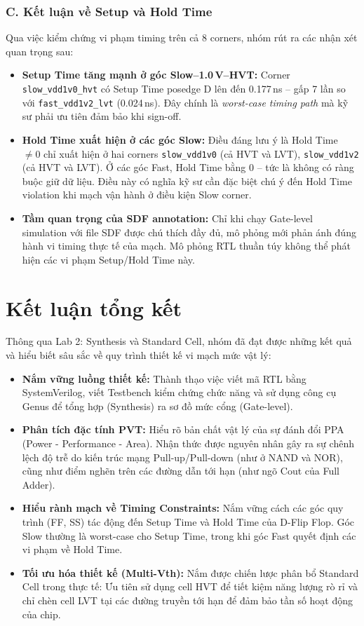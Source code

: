 \documentclass[12pt, a4paper, oneside]{article}
\begin{document}
\subsubsection*{C. Kết luận về Setup và Hold Time}

Qua việc kiểm chứng vi phạm timing trên cả 8 corners, nhóm rút ra các nhận xét quan
trọng sau:

\begin{itemize}
    \item \textbf{Setup Time tăng mạnh ở góc Slow--1.0\,V--HVT:} Corner
    \texttt{slow\_vdd1v0\_hvt} có Setup Time posedge D lên đến 0.177\,ns -- gấp 7 lần so
    với \texttt{fast\_vdd1v2\_lvt} (0.024\,ns). Đây chính là \emph{worst-case timing path}
    mà kỹ sư phải ưu tiên đảm bảo khi sign-off.
    \item \textbf{Hold Time xuất hiện ở các góc Slow:} Điều đáng lưu ý là Hold Time $\neq 0$
    chỉ xuất hiện ở hai corners \texttt{slow\_vdd1v0} (cả HVT và LVT), \texttt{slow\_vdd1v2}
    (cả HVT và LVT). Ở các góc Fast, Hold Time bằng 0 -- tức là không có ràng buộc giữ dữ liệu.
    Điều này có nghĩa kỹ sư cần đặc biệt chú ý đến Hold Time violation khi mạch vận hành ở
    điều kiện Slow corner.
    \item \textbf{Tầm quan trọng của SDF annotation:} Chỉ khi chạy Gate-level simulation với
    file SDF được chú thích đầy đủ, mô phỏng mới phản ánh đúng hành vi timing thực tế của
    mạch. Mô phỏng RTL thuần túy không thể phát hiện các vi phạm Setup/Hold Time này.
\end{itemize}


\section{Kết luận tổng kết}
Thông qua Lab 2: Synthesis và Standard Cell, nhóm đã đạt được những kết quả và hiểu biết sâu sắc về quy trình thiết kế vi mạch mức vật lý:
\begin{itemize}
    \item \textbf{Nắm vững luồng thiết kế:} Thành thạo việc viết mã RTL bằng SystemVerilog, viết Testbench kiểm chứng chức năng và sử dụng công cụ Genus để tổng hợp (Synthesis) ra sơ đồ mức cổng (Gate-level).
    \item \textbf{Phân tích đặc tính PVT:} Hiểu rõ bản chất vật lý của sự đánh đổi PPA (Power - Performance - Area). Nhận thức được nguyên nhân gây ra sự chênh lệch độ trễ do kiến trúc mạng Pull-up/Pull-down (như ở NAND và NOR), cũng như điểm nghẽn trên các đường dẫn tới hạn (như ngõ Cout của Full Adder).
    \item \textbf{Hiểu rành mạch về Timing Constraints:} Nắm vững cách các góc quy trình (FF, SS) tác động đến Setup Time và Hold Time của D-Flip Flop. Góc Slow thường là worst-case cho Setup Time, trong khi góc Fast quyết định các vi phạm về Hold Time.
    \item \textbf{Tối ưu hóa thiết kế (Multi-Vth):} Nắm được chiến lược phân bổ Standard Cell trong thực tế: Ưu tiên sử dụng cell HVT để tiết kiệm năng lượng rò rỉ và chỉ chèn cell LVT tại các đường truyền tới hạn để đảm bảo tần số hoạt động của chip.
\end{itemize}
\end{document}
